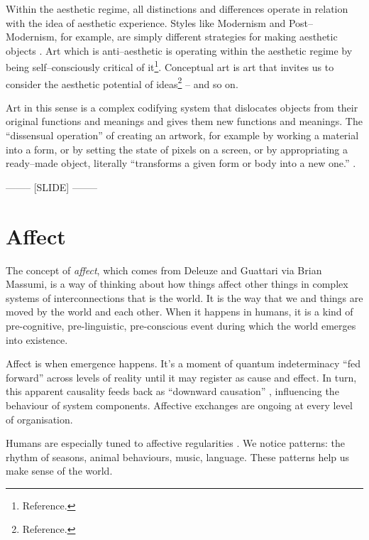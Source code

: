 \documentclass[letter:wpaper]{article}
\begin{document}
    Within the aesthetic regime, all distinctions and differences operate in relation with the idea of aesthetic experience. Styles like Modernism and Post–Modernism, for example, are simply different strategies for making aesthetic objects \citep[p213]{ZepkeSblmArt2017}. Art which is anti–aesthetic is operating within the aesthetic regime by being self–consciously critical of it\footnote{
        Reference.
    }. Conceptual art is art that invites us to consider the aesthetic potential of ideas\footnote{
        Reference.
    } -- and so on.

    Art in this sense is a complex codifying system that dislocates objects from their original functions and meanings and gives them new functions and meanings. The ``dissensual operation'' \citep[p.54]{RancierThEmncptdSpcttr2009} of creating an artwork, for example by working a material into a form, or by setting the state of pixels on a screen, or by appropriating a ready–made object, literally ``transforms a given form or body into a new one.'' \citep[p.54]{RancierThEmncptdSpcttr2009}.

-------- [SLIDE] --------

\section{Affect}

The concept of \emph{affect}, which comes from Deleuze and Guattari via Brian Massumi, is a way of thinking about how things affect other things in complex systems of interconnections that is the world. It is the way that we and things are moved by the world and each other. When it happens in humans, it is a kind of pre-cognitive, pre-linguistic, pre-conscious event during which the world emerges into existence. 

Affect is when emergence happens. It’s a moment of quantum indeterminacy “fed forward” across levels of reality \citep[p.37]{MassumiPrblsFrThVrtl2002} until it may register as cause and effect. In turn, this apparent causality feeds back as “downward causation” \citep[p.?]{FlackCrsGrnng2017}, influencing the behaviour of system components. Affective exchanges are ongoing at every level of organisation.

Humans are especially tuned to affective regularities \citep{FristonThFrEnrgPrncpl2010, DeaconTheSymbolicSpecies1998}. We notice patterns: the rhythm of seasons, animal behaviours, music, language. These patterns help us make sense of the world.
\end{document}
